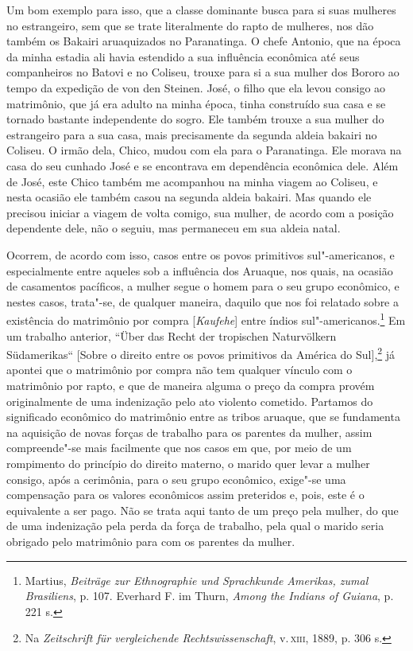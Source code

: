 Um bom exemplo para isso, que a classe dominante busca para si suas
mulheres no estrangeiro, sem que se trate literalmente do rapto de
mulheres, nos dão também os Bakairi aruaquizados no Paranatinga. O
chefe Antonio, que na época da minha estadia ali havia estendido a sua
influência econômica até seus companheiros no Batovi e no Coliseu,
trouxe para si a sua mulher dos Bororo ao tempo da expedição de von den
Steinen. José, o filho que ela levou consigo ao matrimônio, que já era
adulto na minha época, tinha construído sua casa e se tornado bastante
independente do sogro. Ele também trouxe a sua mulher do estrangeiro
para a sua casa, mais precisamente da segunda aldeia bakairi no Coliseu.
O irmão dela, Chico, mudou com ela para o Paranatinga. Ele morava na
casa do seu cunhado José e se encontrava em dependência econômica dele.
Além de José, este Chico também me acompanhou na minha viagem ao
Coliseu, e nesta ocasião ele também casou na segunda aldeia bakairi. Mas
quando ele precisou iniciar a viagem de volta comigo, sua mulher, de
acordo com a posição dependente dele, não o seguiu, mas permaneceu em
sua aldeia natal.

Ocorrem, de acordo com isso, casos entre os povos primitivos
sul"-americanos, e especialmente entre aqueles sob a influência dos
Aruaque, nos quais, na ocasião de casamentos pacíficos, a mulher segue
o homem para o seu grupo econômico, e nestes casos, trata"-se, de
qualquer maneira, daquilo que nos foi relatado sobre a existência do
matrimônio por compra {[}\emph{Kaufehe}{]} entre índios
sul"-americanos.\footnote{Martius, \emph{Beiträge zur Ethnographie und
  Sprachkunde Amerikas, zumal Brasiliens}, p. 107. Everhard F. im
  Thurn, \emph{Among the Indians of Guiana}, p. 221 s.} Em um trabalho
anterior, ``Über das Recht der tropischen Naturvölkern Südamerikas``
{[}Sobre o direito entre os povos primitivos da América do
Sul{]},\footnote{Na \emph{Zeitschrift für vergleichende
  Rechtswissenschaft}, v.\,\textsc{xiii}, 1889, p. 306 s.} já apontei que o
matrimônio por compra não tem qualquer vínculo com o matrimônio por
rapto, e que de maneira alguma o preço da compra provém originalmente de
uma indenização pelo ato violento cometido. Partamos do significado
econômico do matrimônio entre as tribos aruaque, que se fundamenta na
aquisição de novas forças de trabalho para os parentes da mulher, assim
compreende"-se mais facilmente que nos casos em que, por meio de um
rompimento do princípio do direito materno, o marido quer levar a mulher
consigo, após a cerimônia, para o seu grupo econômico, exige"-se uma
compensação para os valores econômicos assim preteridos e, pois, este é
o equivalente a ser pago. Não se trata aqui tanto de um preço pela
mulher, do que de uma indenização pela perda da força de trabalho, pela
qual o marido seria obrigado pelo matrimônio para com os parentes da
mulher.

